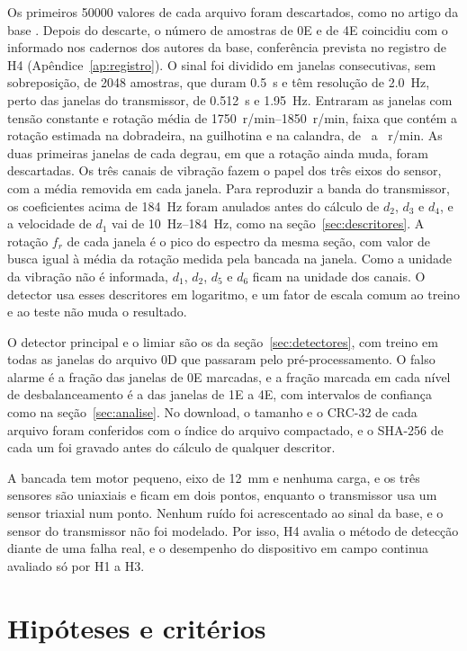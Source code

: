 Os primeiros \num{50000} valores de cada arquivo foram descartados, como no artigo da base \cite{mey2020}. Depois do descarte, o número de amostras de 0E e de 4E coincidiu com o informado nos cadernos dos autores da base, conferência prevista no registro de H4 (Apêndice~\ref{ap:registro}). O sinal foi dividido em janelas consecutivas, sem sobreposição, de \num{2048} amostras, que duram \SI{0,5}{\second} e têm resolução de \SI{2,0}{\hertz}, perto das janelas do transmissor, de \SI{0,512}{\second} e \SI{1,95}{\hertz}. Entraram as janelas com tensão constante e rotação média de \SIrange{1750}{1850}{r/min}, faixa que contém a rotação estimada na dobradeira, na guilhotina e na calandra, de \rotacaoRpmMin\ a \rotacaoRpmMax~r/min. As duas primeiras janelas de cada degrau, em que a rotação ainda muda, foram descartadas. Os três canais de vibração fazem o papel dos três eixos do sensor, com a média removida em cada janela. Para reproduzir a banda do transmissor, os coeficientes acima de \SI{184}{\hertz} foram anulados antes do cálculo de $d_2$, $d_3$ e $d_4$, e a velocidade de $d_1$ vai de \SIrange{10}{184}{\hertz}, como na seção~\ref{sec:descritores}. A rotação $f_r$ de cada janela é o pico do espectro da mesma seção, com valor de busca igual à média da rotação medida pela bancada na janela. Como a unidade da vibração não é informada, $d_1$, $d_2$, $d_5$ e $d_6$ ficam na unidade dos canais. O detector usa esses descritores em logaritmo, e um fator de escala comum ao treino e ao teste não muda o resultado.

O detector principal e o limiar são os da seção~\ref{sec:detectores}, com treino em todas as janelas do arquivo 0D que passaram pelo pré-processamento. O falso alarme é a fração das janelas de 0E marcadas, e a fração marcada em cada nível de desbalanceamento é a das janelas de 1E a 4E, com intervalos de confiança como na seção~\ref{sec:analise}. No download, o tamanho e o CRC-32 de cada arquivo foram conferidos com o índice do arquivo compactado, e o SHA-256 de cada um foi gravado antes do cálculo de qualquer descritor.

A bancada tem motor pequeno, eixo de \SI{12}{\milli\meter} e nenhuma carga, e os três sensores são uniaxiais e ficam em dois pontos, enquanto o transmissor usa um sensor triaxial num ponto. Nenhum ruído foi acrescentado ao sinal da base, e o sensor do transmissor não foi modelado. Por isso, H4 avalia o método de detecção diante de uma falha real, e o desempenho do dispositivo em campo continua avaliado só por H1 a H3.

\section{Hipóteses e critérios}\label{sec:hipoteses}

